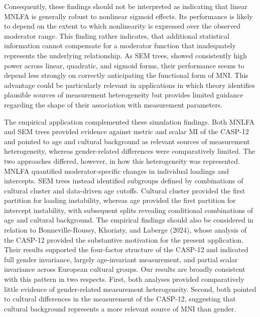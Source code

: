 \documentclass[
  man,
  floatsintext]{apa7}
\begin{document}
Consequently, these findings should not be interpreted as indicating
that linear MNLFA is generally robust to nonlinear sigmoid effects. Its
performance is likely to depend on the extent to which nonlinearity is
expressed over the observed moderator range. This finding rather
indicates, that additional statistical information cannot compensate for
a moderator function that inadequately represents the underlying
relationship. As SEM trees, showed consistently high power across
linear, quadratic, and sigmoid forms, their performance seems to depend
less strongly on correctly anticipating the functional form of MNI. This
advantage could be particularly relevant in applications in which theory
identifies plausible sources of measurement heterogeneity but provides
limited guidance regarding the shape of their association with
measurement parameters.

The empirical application complemented these simulation findings. Both
MNLFA and SEM trees provided evidence against metric and scalar MI of
the CASP-12 and pointed to age and cultural background as relevant
sources of measurement heterogeneity, whereas gender-related differences
were comparatively limited. The two approaches differed, however, in how
this heterogeneity was represented. MNLFA quantified moderator-specific
changes in individual loadings and intercepts. SEM trees instead
identified subgroups defined by combinations of cultural cluster and
data-driven age cutoffs. Cultural cluster provided the first partition
for loading instability, whereas age provided the first partition for
intercept instability, with subsequent splits revealing conditional
combinations of age and cultural background. The empirical findings
should also be considered in relation to Bonneville-Roussy, Khoriaty,
and Laberge (2024), whose analysis of the CASP-12 provided the
substantive motivation for the present application. Their results
supported the four-factor structure of the CASP-12 and indicated full
gender invariance, largely age-invariant measurement, and partial scalar
invariance across European cultural groups. Our results are broadly
consistent with this pattern in two respects. First, both analyses
provided comparatively little evidence of gender-related measurement
heterogeneity. Second, both pointed to cultural differences in the
measurement of the CASP-12, suggesting that cultural background
represents a more relevant source of MNI than gender.
\end{document}
